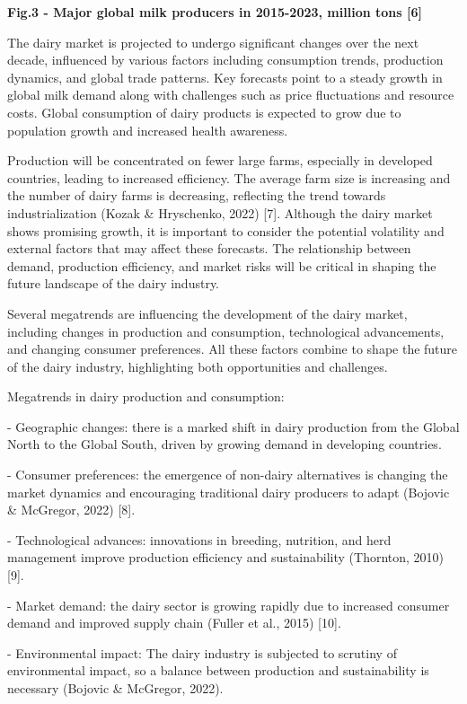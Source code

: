 {\bfseries Fig.3 - Major global milk producers in 2015-2023, million tons
{[}6{]}}

The dairy market is projected to undergo significant changes over the
next decade, influenced by various factors including consumption trends,
production dynamics, and global trade patterns. Key forecasts point to a
steady growth in global milk demand along with challenges such as price
fluctuations and resource costs. Global consumption of dairy products is
expected to grow due to population growth and increased health
awareness.

Production will be concentrated on fewer large farms, especially in
developed countries, leading to increased efficiency. The average farm
size is increasing and the number of dairy farms is decreasing,
reflecting the trend towards industrialization (Kozak \& Hryschenko,
2022) {[}7{]}. Although the dairy market shows promising growth, it is
important to consider the potential volatility and external factors that
may affect these forecasts. The relationship between demand, production
efficiency, and market risks will be critical in shaping the future
landscape of the dairy industry.

Several megatrends are influencing the development of the dairy market,
including changes in production and consumption, technological
advancements, and changing consumer preferences. All these factors
combine to shape the future of the dairy industry, highlighting both
opportunities and challenges.

Megatrends in dairy production and consumption:

- Geographic changes: there is a marked shift in dairy production from
the Global North to the Global South, driven by growing demand in
developing countries.

- Consumer preferences: the emergence of non-dairy alternatives is
changing the market dynamics and encouraging traditional dairy producers
to adapt (Bojovic \& McGregor, 2022) {[}8{]}.

- Technological advances: innovations in breeding, nutrition, and herd
management improve production efficiency and sustainability (Thornton,
2010) {[}9{]}.

- Market demand: the dairy sector is growing rapidly due to increased
consumer demand and improved supply chain (Fuller et al., 2015)
{[}10{]}.

- Environmental impact: The dairy industry is subjected to scrutiny of
environmental impact, so a balance between production and sustainability
is necessary (Bojovic \& McGregor, 2022).

